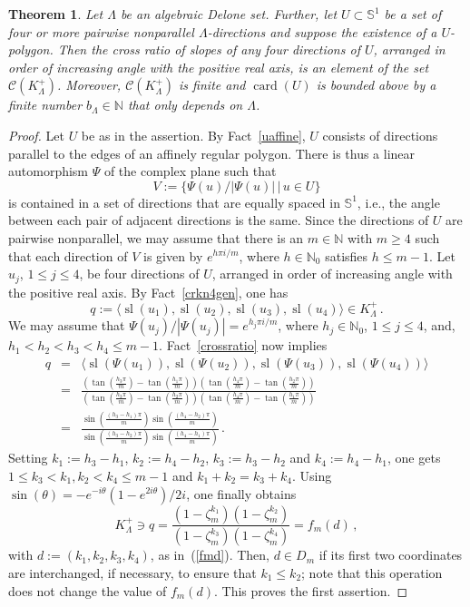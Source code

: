 \documentclass[a4paper]{amsart}
\newtheorem{theorem}{Theorem}[section]
\theoremstyle{definition}
\numberwithin{equation}{section}
\numberwithin{theorem}{section}
\begin{document}
\begin{theorem}\label{main}
Let $\varLambda$ be an algebraic Delone set. Further, let $U\subset\mathbb{S}^1$ be a set of four or more pairwise
nonparallel $\varLambda$-directions and suppose the existence of a
$U$-polygon. Then the
cross ratio of slopes of any four directions of $U$, arranged in order
of increasing angle with the positive real axis, is an element of the
 set
$\mathcal{C}(K_{\varLambda}^+)$.  Moreover,
$\mathcal{C}(K_{\varLambda}^+)$ is finite and $\operatorname{card}(U)$ is bounded above by a finite number
$b_{\varLambda}\in{\mathbb{N}}$ that only depends on $\varLambda$. 
\end{theorem}
\begin{proof}
Let $U$ be as in the assertion. By Fact~\ref{uaffine}, $U$ consists
of directions parallel to the edges of an affinely regular
polygon. There is thus a linear automorphism $\Psi$ of
the complex 
plane such that
$$
V:= \big\{ \Psi(u)/| \Psi(u)|\, \big |\, u\in U \big \}
$$ 
is contained in a set of directions that are equally spaced
in $\mathbb{S}^{1}$, i.e., the angle between each pair of adjacent
directions is the same. Since the directions of $U$ are pairwise
nonparallel, we may assume that there is an $m\in{\mathbb{N}}$ with $m\geq 4$ such that
each direction of $V$ is given by $e^{h\pi i/m}$, where
$h\in{\mathbb{N}}_{0}$ satisfies $h\leq m-1$. Let $u_{j}$, $1\leq
j\leq 4$, be four
directions of $U$, arranged in order
of increasing angle with the positive real axis. By
Fact~\ref{crkn4gen}, one has
$$q:=\big\langle
\operatorname{sl}(u_{1}),\operatorname{sl}(u_{2}),\operatorname{sl}(u_{3}),\operatorname{sl}(u_{4})\big\rangle\in K_{\varLambda}^+\,.$$ We may assume that $\Psi(u_{j})/| \Psi(u_{j})| =e^{h_{j}\pi i/m}$, where $h_j \in{\mathbb{N}}_{0}$,
$1\leq j \leq 4$, and, $h_1<h_2<h_3<h_4\leq
m-1$. Fact~\ref{crossratio} now implies
\begin{eqnarray*}
q&=&\big \langle \operatorname{sl}(\Psi(u_1)),\operatorname{sl}(\Psi(u_2)),\operatorname{sl}(\Psi(u_3)),\operatorname{sl}(\Psi(u_4))\big\rangle\\&=&\frac{(\tan (\frac{h_3 \pi}{m})- \tan (\frac{h_1 \pi}{m}))(\tan (\frac{h_4 \pi}{m})- \tan (\frac{h_2 \pi}{m}))}{(\tan (\frac{h_3 \pi}{m})- \tan (\frac{h_2 \pi}{m}))(\tan (\frac{h_4 \pi}{m})- \tan (\frac{h_1 \pi}{m}))}\\
&=&\frac{\sin(\frac{(h_3-h_1)\pi}{m})\sin(\frac{(h_4-h_2)\pi}{m})}{\sin(\frac{(h_3-h_2)\pi}{m})\sin(\frac{(h_4-h_1)\pi}{m})}\,.
\end{eqnarray*}
Setting $k_1:=h_3-h_1$, $k_2:=h_4-h_2$, $k_3:=h_3-h_2$ and
$k_4:=h_4-h_1$, one gets $1\leq k_3<k_1, k_2<k_4\leq m-1$ and
$k_1+k_2=k_3+k_4$. Using
$\sin(\theta)=-e^{-i\theta}(1-e^{2i\theta})/2i$, one finally 
obtains
$$
K_{\varLambda}^+\owns q=\frac{(1-\zeta_{m}^{k_1})(1-\zeta_{m}^{k_2})}{(1-\zeta_{m}^{k_3})(1-\zeta_{m}^{k_4})}=f_m(d)\,,
$$
with $d:=(k_1,k_2,k_3,k_4)$, as in~(\ref{fmd}). Then, $d\in D_m$ if its
first two coordinates are interchanged, if necessary, to ensure that
$k_1\leq k_2$; note that this operation does not change the value of
$f_m(d)$. This proves the first assertion.


\end{proof}
\end{document}
